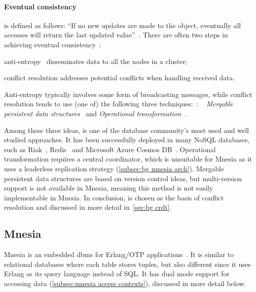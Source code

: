 \paragraph{Eventual consistency} 
is defined as follows: ``If no new updates are made to the object,
eventually all accesses will return the last updated value''~\cite{vogels2008ec}. 
There are often two steps in achieving eventual consistency~\cite{wikipediacontributors2023ec}:
\begin{enumerate*}[(i)]
  \item anti-entropy~\cite{demers1987epidemic} disseminates data to all the nodes 
  in a cluster;
  \item conflict resolution addresses potential conflicts when handling received data.
\end{enumerate*}

Anti-entropy typically involves some form of broadcasting messages, while conflict
resolution tends to use (one of) the following three techniques:~\cite{kleppmann2017DDIA}:
\emph{}~\cite{shapiro2011CRDT,preguica2018CRDT}
\emph{Mergable persistent data structures}~\cite{farinier2015mergable} and
\emph{Operational transformation}~\cite{ellis1989ot}. 

Among these three ideas,  is one of the 
database community's most used and well studied approaches. It has been
successfully deployed in many NoSQL databases, such as 
Riak~\cite{klophaus2010Riak}, Redis~\cite{redis2022rediscrdt} and Microsoft Azure 
Cosmos DB~\cite{shukla2018CosmosDB}. Operational transformation requires a central 
coordinator, which
is unsuitable for Mnesia as it uses a leaderless replication strategy (\cref{subsec:bg mnesia arch}). 
Mergable persistent data structures are based on version
control ideas, but multi-version support is not available in Mnesia,
meaning this method is not easily implementable in Mnesia. In conclusion,
 is chosen as the basis of conflict resolution and discussed in
more detail in~\cref{sec:bg crdt}.


\subsection{Mnesia} \label{sec:bg mnesia}

Mnesia is an embedded \acrshort{dbms} for Erlang/OTP 
applications~\cite{mattsson1998mnesia,mattsson1999mnesiainternal}.
It is similar to relational databases where each table stores tuples, but also
different since it uses Erlang as its query language instead of SQL\@.
It has dual mode support for accessing data (\cref{subsec:mnesia access contexts}),
discussed in more detail below.

